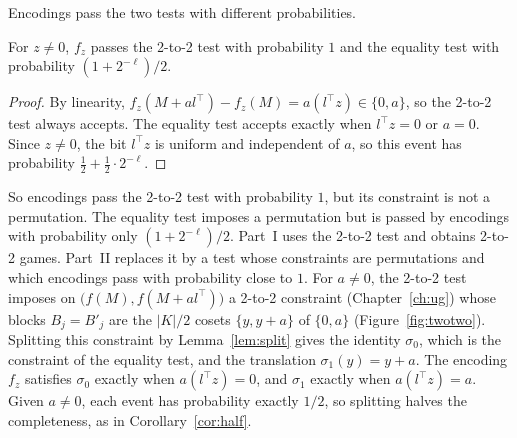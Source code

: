 Encodings pass the two tests with different probabilities.

\begin{lemma}\label{lem:completeness}
For $z\ne0$, $f_z$ passes the 2-to-2 test with probability $1$ and the equality test with probability $(1+2^{-\ell})/2$.
\end{lemma}

\begin{proof}
By linearity, $f_z(M+al^\top)-f_z(M)=a(l^\top z)\in\{0,a\}$, so the 2-to-2 test always accepts. The equality test accepts exactly when $l^\top z=0$ or $a=0$. Since $z\ne0$, the bit $l^\top z$ is uniform and independent of $a$, so this event has probability $\tfrac12+\tfrac12\cdot2^{-\ell}$.
\end{proof}

So encodings pass the 2-to-2 test with probability $1$, but its constraint is not a permutation. The equality test imposes a permutation but is passed by encodings with probability only $(1+2^{-\ell})/2$. Part~I uses the 2-to-2 test and obtains 2-to-2 games. Part~II replaces it by a test whose constraints are permutations and which encodings pass with probability close to $1$. For $a\ne0$, the 2-to-2 test imposes on $\bigl(f(M),f(M+al^\top)\bigr)$ a 2-to-2 constraint (Chapter~\ref{ch:ug}) whose blocks $B_j=B'_j$ are the $|K|/2$ cosets $\{y,y+a\}$ of $\{0,a\}$ (Figure~\ref{fig:twotwo}). Splitting this constraint by Lemma~\ref{lem:split} gives the identity $\sigma_0$, which is the constraint of the equality test, and the translation $\sigma_1(y)=y+a$. The encoding $f_z$ satisfies $\sigma_0$ exactly when $a(l^\top z)=0$, and $\sigma_1$ exactly when $a(l^\top z)=a$. Given $a\ne0$, each event has probability exactly $1/2$, so splitting halves the completeness, as in Corollary~\ref{cor:half}.

